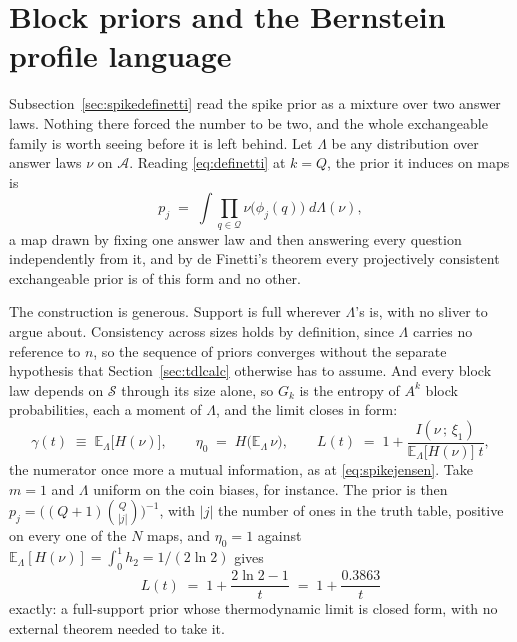 \documentclass[11pt]{article}
\let\stdsection\section
\renewcommand{\section}{\clearpage\stdsection}
\begin{document}
\section{Block priors and the Bernstein profile language}\label{app:blockpriors}

Subsection~\ref{sec:spikedefinetti} read the spike prior as a mixture over
two answer laws. Nothing there forced the number to be two, and the
whole exchangeable family is worth seeing before it is left behind.
Let $\Lambda$ be any distribution over answer laws $\nu$ on
$\mathcal A$. Reading \eqref{eq:definetti} at $k = Q$, the prior it
induces on maps is
%
\begin{equation}
  p_j \;=\; \int \prod_{q \in \mathcal Q} \nu\big(\phi_j(q)\big)\;
  d\Lambda(\nu),
  \label{eq:definettiprior}
\end{equation}
%
a map drawn by fixing one answer law and then answering every question
independently from it, and by de Finetti's theorem
\cite{definetti37,hewittsavage} every projectively consistent
exchangeable prior is of this form and no other.

The construction is generous. Support is full wherever $\Lambda$'s is,
with no sliver to argue about. Consistency across sizes holds by
definition, since $\Lambda$ carries no reference to $n$, so the
sequence of priors converges without the separate hypothesis that
Section~\ref{sec:tdlcalc} otherwise has to assume. And every block law
depends on $\mathcal S$ through its size alone, so $G_k$ is the entropy
of $A^k$ block probabilities, each a moment of $\Lambda$, and the limit
closes in form:
%
\begin{equation}
  \gamma(t) \;\equiv\; \mathbb E_\Lambda\big[H(\nu)\big],
  \qquad
  \eta_0 \;=\; H\big(\mathbb E_\Lambda\, \nu\big),
  \qquad
  L(t) \;=\; 1 + \frac{I(\nu\,;\,\xi_1)}
                      {\mathbb E_\Lambda\big[H(\nu)\big]\; t},
  \label{eq:definettilimit}
\end{equation}
%
the numerator once more a mutual information, as at
\eqref{eq:spikejensen}. Take $m = 1$ and $\Lambda$ uniform on the coin
biases, for instance. The prior is then
$p_j = \big((Q+1)\binom{Q}{|j|}\big)^{-1}$, with $|j|$ the number of
ones in the truth table, positive on every one of the $N$ maps, and
$\eta_0 = 1$ against
$\mathbb E_\Lambda[H(\nu)] = \int_0^1 h_2 = 1/(2\ln 2)$ gives
%
\begin{equation}
  L(t) \;=\; 1 + \frac{2\ln 2 - 1}{t} \;=\; 1 + \frac{0.3863}{t}
  \label{eq:definettiuniform}
\end{equation}
%
exactly: a full-support prior whose thermodynamic limit is closed form,
with no external theorem needed to take it.
\end{document}
